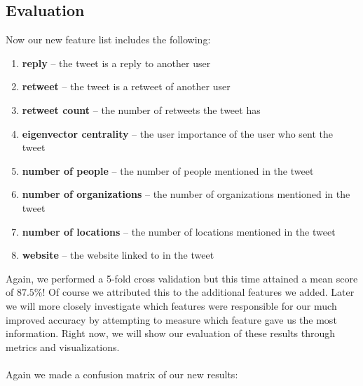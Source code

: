 \documentclass[12pt]{article}
\begin{document}
\subsection{Evaluation}
Now our new feature list includes the following:
\begin{enumerate}
	\item \textbf{reply}                    -- the tweet is a reply to another user 
	\item \textbf{retweet}                  -- the tweet is a retweet of another user 
	\item \textbf{retweet count}            -- the number of retweets the tweet has  
	\item \textbf{eigenvector centrality}   -- the user importance of the user who sent the tweet 
	\item \textbf{number of people}         -- the number of people mentioned in the tweet
	\item \textbf{number of organizations}  -- the number of organizations mentioned in the tweet
	\item \textbf{number of locations}      -- the number of locations mentioned in the tweet
	\item \textbf{website}                  -- the website linked to in the tweet
\end{enumerate}
Again, we performed a 5-fold cross validation but this time attained a mean score of $87.5$\%! Of course we attributed this to the additional features we added. Later we will more closely investigate which features were responsible for our much improved accuracy by attempting to measure which feature gave us the most information. Right now, we will show our evaluation of these results through metrics and visualizations.
\\
\\
Again we made a confusion matrix of our new results:
\end{document}

